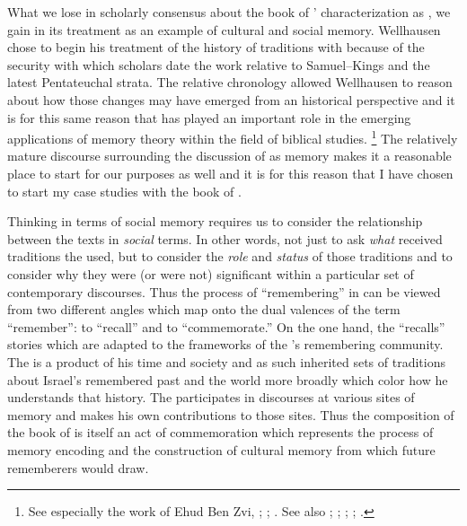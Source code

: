 What we lose in scholarly consensus about the book of \chronicles' characterization as \rwb, we gain in its treatment as an example of cultural and social memory. Wellhausen chose to begin his treatment of the history of traditions with \chronicles because of the security with which scholars date the work relative to Samuel--Kings and the latest Pentateuchal strata. The relative chronology allowed Wellhausen to reason about how those changes may have emerged from an historical perspective and it is for this same reason that \chronicles has played an important role in the emerging applications of memory theory within the field of biblical studies.%
\footnote{%
    See especially the work of Ehud Ben Zvi,
    \cite*{benzvi_st2017};
    \cite*{benzvi-a_evans-williams2013};
    \cite*{benzvi-b_evans-williams2013}.
    See also \cite{wilson2017};
    \cite[26--30]{rogerson2010};
    \cite[104--114]{blenkinsopp2013};
    \cite[148-166]{wright2014};
    \cite{jarick_frohlich2019}.
    }
The relatively mature discourse surrounding the discussion of \chronicles as memory makes it a reasonable place to start for our purposes as well and it is for this reason that I have chosen to start my case studies with the book of \chronicles.

Thinking in terms of social memory requires us to consider the relationship between the texts in \emph{social} terms. In other words, not just to ask \emph{what} received traditions the \chronicler used, but to consider the \emph{role} and \emph{status} of those traditions and to consider why they were (or were not) significant within a particular set of contemporary discourses. Thus the process of ``remembering'' in \chronicles can be viewed from two different angles which map onto the dual valences of the term ``remember'': to ``recall'' and to ``commemorate.'' On the one hand, the \chronicler ``recalls'' stories which are adapted to the frameworks of the \chronicler's remembering community. The \chronicler is a product of his time and society and as such inherited sets of traditions about Israel's remembered past and the world more broadly which color how he understands that history. The \chronicler participates in discourses at various sites of memory and makes his own contributions to those sites. Thus the composition of the book of \chronicles is itself an act of commemoration which represents the process of memory encoding and the construction of cultural memory from which future rememberers would draw.

